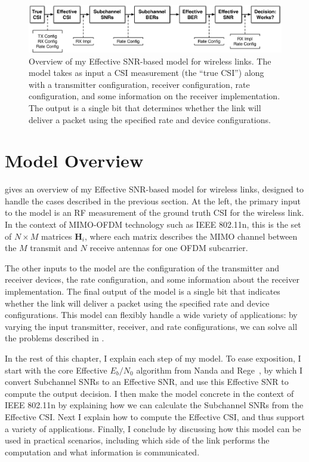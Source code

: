 \begin{figure}[ht]
\centering
\includegraphics[width=\textwidth]{figures/esnr_model_overview.pdf}
\caption[Model overview]{\label{fig:model_overview}Overview of my Effective SNR-based model for wireless links. The model takes as input a CSI measurement (the ``true CSI'') along with a transmitter configuration, receiver configuration, rate configuration, and some information on the receiver implementation. The output is a single bit that determines whether the link will deliver a packet using the specified rate and device configurations.}
\end{figure}

\section{Model Overview}
 gives an overview of my Effective SNR-based model for wireless links, designed to handle the cases described in the previous section. At the left, the primary input to the model is an RF measurement of the ground truth CSI for the wireless link. In the context of MIMO-OFDM technology such as IEEE 802.11n, this is the set of $N\times M$ matrices $\mathbf{H}_i$, where each matrix describes the MIMO channel between the $M$ transmit and $N$ receive antennas for one OFDM subcarrier.

The other inputs to the model are the configuration of the transmitter and receiver devices, the rate configuration, and some information about the receiver implementation. The final output of the model is a single bit that indicates whether the link will deliver a packet using the specified rate and device configurations. This model can flexibly handle a wide variety of applications: by varying the input transmitter, receiver, and rate configurations, we can solve all the problems described in .

In the rest of this chapter, I explain each step of my model. To ease exposition, I start with the core Effective $E_b/N_0$ algorithm from Nanda and Rege~\cite{Nanda_EffectiveSNR}, by which I convert Subchannel SNRs to an Effective SNR, and use this Effective SNR to compute the output decision. I then make the model concrete in the context of IEEE 802.11n by explaining how we can calculate the Subchannel SNRs from the Effective CSI. Next I explain how to compute the Effective CSI, and thus support a variety of applications. Finally, I conclude by discussing how this model can be used in practical scenarios, including which side of the link performs the computation and what information is communicated.

